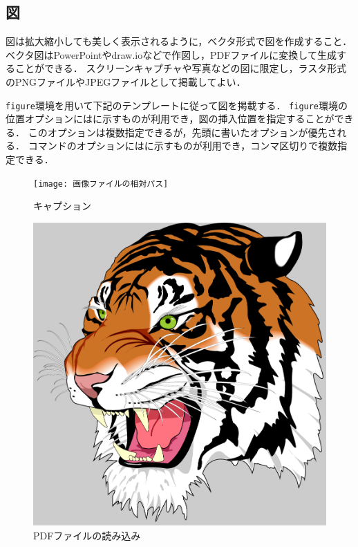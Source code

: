 \documentclass[a4j,11pt]{ujreport}
\begin{document}
\subsection{図}
図は拡大縮小しても美しく表示されるように，ベクタ形式で図を作成すること．
ベクタ図はPowerPointやdraw.ioなどで作図し，PDFファイルに変換して生成することができる．
スクリーンキャプチャや写真などの図に限定し，ラスタ形式のPNGファイルやJPEGファイルとして掲載してよい．

\texttt{figure}環境を用いて下記のテンプレートに従って図を掲載する．
\texttt{figure}環境の位置オプションにはに示すものが利用でき，図の挿入位置を指定することができる．
このオプションは複数指定できるが，先頭に書いたオプションが優先される．
コマンドのオプションにはに示すものが利用でき，コンマ区切りで複数指定できる．

\begin{code}
\begin{figure}[位置]
	\centering
	\texttt{[image: 画像ファイルの相対パス]}
	\caption{キャプション}
	\label{fig:ラベル}
\end{figure}
\end{code}%

\begin{figure}[ht]
	\centering
	\includegraphics[clip,scale=0.3]{fig/tiger.pdf}
	\caption{PDFファイルの読み込み}
	\label{fig:ExamplePDF}
\end{figure}
\end{document}
